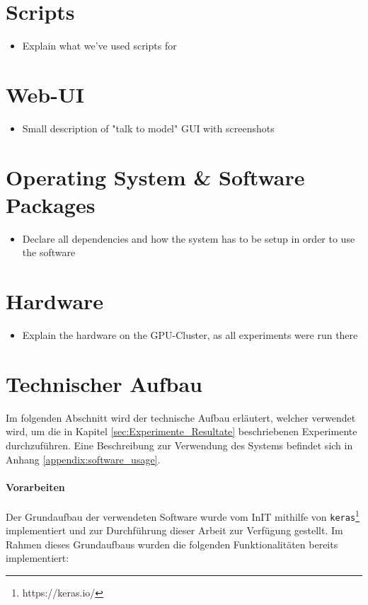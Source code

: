 \section{Scripts}
\begin{itemize}
	\item Explain what we've used scripts for
\end{itemize}
\section{Web-UI}
\begin{itemize}
	\item Small description of "talk to model" GUI with screenshots
\end{itemize}
\section{Operating System \& Software Packages}
\begin{itemize}
	\item Declare all dependencies and how the system has to be setup in order to use the software
\end{itemize}
\section{Hardware}
\begin{itemize}
	\item Explain the hardware on the GPU-Cluster, as all experiments were run there
\end{itemize}

\iffalse
\section{Technischer Aufbau}
\label{technical_setup}
Im folgenden Abschnitt wird der technische Aufbau erläutert, welcher verwendet wird, um die in Kapitel \ref{sec:Experimente_Resultate} beschriebenen Experimente durchzuführen. Eine Beschreibung zur Verwendung des Systems befindet sich in Anhang \ref{appendix:software_usage}.

\paragraph{Vorarbeiten}
\label{technichal_setup:prework}
Der Grundaufbau der verwendeten Software wurde vom InIT mithilfe von \texttt{keras}\footnote{https://keras.io/} implementiert und zur Durchführung dieser Arbeit zur Verfügung gestellt. Im Rahmen dieses Grundaufbaus wurden die folgenden Funktionalitäten bereits implementiert:


